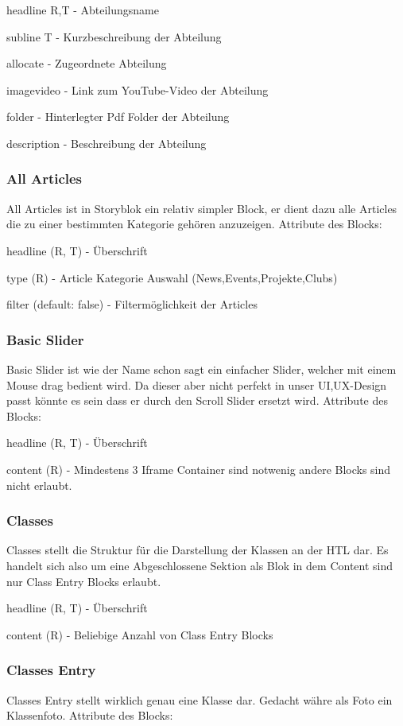 headline R,T - Abteilungsname 

subline T - Kurzbeschreibung der Abteilung

allocate - Zugeordnete Abteilung 

imagevideo - Link zum YouTube-Video der Abteilung

folder - Hinterlegter Pdf Folder der Abteilung

description - Beschreibung der Abteilung

\subsubsection*{All Articles }
All Articles ist in Storyblok ein relativ simpler Block, er dient dazu alle Articles die zu einer bestimmten Kategorie gehören anzuzeigen. Attribute des Blocks:

headline (R, T) - Überschrift 

type (R) - Article Kategorie Auswahl (News,Events,Projekte,Clubs)

filter (default: false) - Filtermöglichkeit der Articles

\subsubsection*{Basic Slider}
Basic Slider ist wie der Name schon sagt ein einfacher Slider, welcher mit einem Mouse drag bedient wird. Da dieser aber nicht perfekt in unser UI,UX-Design passt könnte es sein dass er durch den Scroll Slider ersetzt wird. Attribute des Blocks:

headline (R, T) - Überschrift

content (R) - Mindestens 3 Iframe Container sind notwenig andere Blocks sind nicht erlaubt.

\subsubsection*{Classes}
Classes stellt die Struktur für die Darstellung der Klassen an der HTL dar. Es handelt sich also um eine Abgeschlossene Sektion als Blok in dem Content sind nur Class Entry Blocks erlaubt.

headline (R, T) - Überschrift

content (R) - Beliebige Anzahl von Class Entry Blocks

\subsubsection*{Classes Entry}
Classes Entry stellt wirklich genau eine Klasse dar. Gedacht währe als Foto ein Klassenfoto. Attribute des Blocks:

